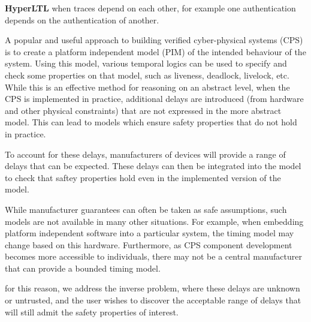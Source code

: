 


\textbf{HyperLTL} when traces depend on each other, for example one authentication depends on the authentication of another.

A popular and useful approach to building verified cyber-physical systems (CPS) is to create a platform independent model (PIM) of the intended behaviour of the system. Using this model, various temporal logics can be used to specify and check some properties on that model, such as liveness, deadlock, livelock, etc. While this is an effective method for reasoning on an abstract level, when the CPS is implemented in practice, additional delays are introduced (from hardware and other physical constraints) that are not expressed in the more abstract model. This can lead to models which ensure safety properties that do not hold in practice.

To account for these delays, manufacturers of devices will provide a range of delays that can be expected. These delays can then be integrated into the model to check that saftey properties hold even in the implemented version of the model. 


While manufacturer guarantees can often be taken as safe assumptions, such models are not available in many other situations. For example, when embedding platform independent software into a particular system, the timing model may change based on this hardware. Furthermore, as CPS component development becomes more accessible to individuals, there may not be a central manufacturer that can provide a bounded timing model.

for this reason, we address the inverse problem, where these delays are unknown or untrusted, and the user wishes to discover the acceptable range of delays that will still admit the safety properties of interest.



    

